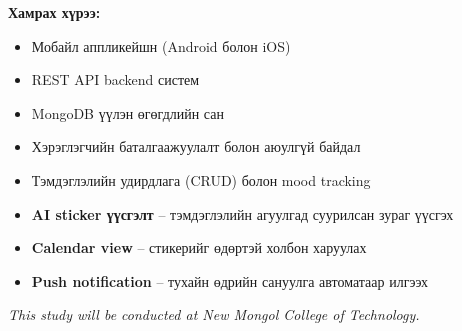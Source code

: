 \textbf{Хамрах хүрээ:}
\begin{itemize}
  \item Мобайл аппликейшн (Android болон iOS)
  \item REST API backend систем
  \item MongoDB үүлэн өгөгдлийн сан
  \item Хэрэглэгчийн баталгаажуулалт болон аюулгүй байдал
  \item Тэмдэглэлийн удирдлага (CRUD) болон mood tracking
  \item \textbf{AI sticker үүсгэлт} -- тэмдэглэлийн агуулгад суурилсан зураг үүсгэх
  \item \textbf{Calendar view} -- стикерийг өдөртэй холбон харуулах
  \item \textbf{Push notification} -- тухайн өдрийн сануулга автоматаар илгээх
\end{itemize}

\vspace{0.3cm}
\noindent\textit{This study will be conducted at New Mongol College of Technology.}

